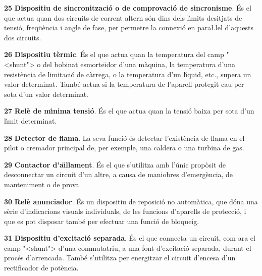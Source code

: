 \begin{multicols}{2}
\begin{list}{}
\item[\textbf{25}]  \textbf{Dispositiu de sincronitzaci\'{o} o de comprovaci\'{o}
de sincronisme}. \'{E}s el que actua quan dos circuits de corrent altern
s\'{o}n dins dels l\'{\i}mits desitjats de tensi\'{o}, freq\"{u}\`{e}ncia i angle de
fase, per permetre la connexi\'{o} en para{\l.l}el d'aquests dos circuits.


\item[\textbf{26}]  \textbf{Dispositiu t\`{e}rmic}. \'{E}s el que
actua quan la temperatura del camp {"<}shunt{">} o del bobinat esmorte\"{\i}dor
d'una m\`{a}quina, la temperatura d'una resist\`{e}ncia de limitaci\'{o} de
c\`{a}rrega, o la temperatura d'un l\'{\i}quid, etc., supera un valor
determinat. Tamb\'{e} actua si la temperatura de l'aparell protegit cau
per sota d'un valor determinat.

\item[\textbf{27}]  \textbf{Rel\`{e} de m\'{\i}nima tensi\'{o}}. \'{E}s el que
actua quan la tensi\'{o} baixa per sota d'un l\'{\i}mit determinat.

\item[\textbf{28}]  \textbf{Detector de flama}. La seva funci\'{o} \'{e}s
detectar l'exist\`{e}ncia de flama en el pilot o cremador principal de, per exemple, una
caldera o una turbina de gas.

\item[\textbf{29}]  \textbf{Contactor d'a\"{\i}llament}. \'{E}s el que
s'utilitza amb l'\'{u}nic prop\`{o}sit de desconnectar un circuit d'un
altre,  a  causa de maniobres    d'emerg\`{e}ncia,  de manteniment o de
prova.

\item[\textbf{30}]  \textbf{Rel\`{e} anunciador}. \'{E}s un dispositiu de
reposici\'{o} no autom\`{a}tica, que d\'{o}na una s\`{e}rie d'indicacions visuals
individuals, de les funcions d'aparells de protecci\'{o}, i que es pot
disposar tamb\'{e} per efectuar una funci\'{o} de bloqueig.

\item[\textbf{31}]  \textbf{Dispositiu d'excitaci\'{o}
separada}. \'{E}s el que connecta un circuit, com ara el camp {"<}shunt{">}
d'una commutatriu, a una font d'excitaci\'{o} separada, durant el proc\'{e}s
d'arrencada. Tamb\'{e} s'utilitza per energitzar el circuit d'encesa
d'un rectificador de pot\`{e}ncia.



\end{list}
\end{multicols}
